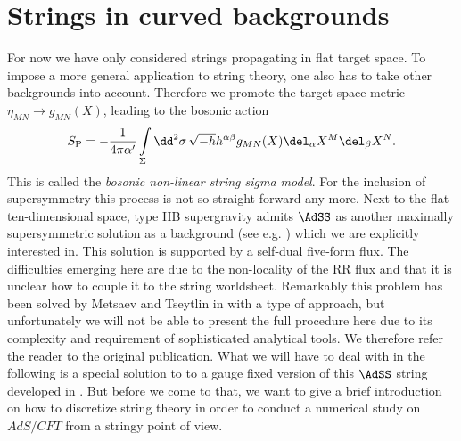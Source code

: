 \section{Strings in curved backgrounds}
For now we have only considered strings propagating in flat  target space. To impose a more general application to string theory, one also has to take other backgrounds into account. Therefore we promote the target space metric $\eta_{MN}\rightarrow g_{MN}(X)$, leading to the bosonic  action
%
%
\begin{equation}
S_{\rm P} = -\frac{1}{4\pi\alpha'}  \int\limits_{\Sigma} \dd^{2}\sigma\, \sqrt{-h}h^{\alpha\beta}g_{MN}(X) \del_{\alpha}X^{M}\del_{\beta}X^{N}.
\label{eq: S_P_nlsigma}
\end{equation}
%
%
This is called the \textit{bosonic non-linear string sigma model}. For the inclusion of supersymmetry this process is not so straight forward any more. Next to the flat ten-dimensional  space, type IIB supergravity admits $\AdSS$ as another maximally supersymmetric solution as a background (see e.g. \cite{Arutyunov:2009ga}) which we are explicitly interested in. This solution is supported by a self-dual  five-form flux. The difficulties emerging here are due to the non-locality of the RR flux and that it is unclear how to couple it to the string worldsheet. Remarkably this problem has been solved by Metsaev and Tseytlin in \cite{Metsaev:1998it} with a  type of approach, but unfortunately we will not be able to present the full procedure here due to its complexity and requirement of sophisticated analytical tools. We therefore refer the reader to the original publication. What we will have to deal with in the following is a special solution to to a gauge fixed version of this $\AdSS$ string developed in \cite{Metsaev:1998it}. But before we come to that, we want to give a brief introduction on how to discretize string theory in order to conduct a numerical study on $AdS/CFT$ from a stringy point of view.
